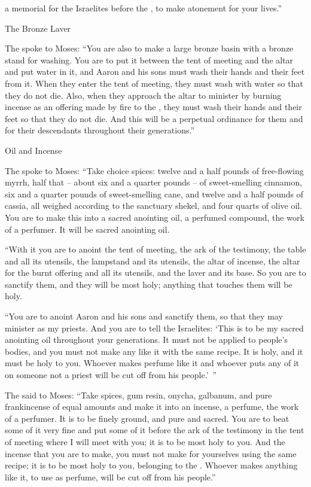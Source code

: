 {a memorial
for the Israelites
before
the {}, to make atonement
for your lives.”
\par }{\SH The Bronze Laver
\par }{\PP {}The
{}
spoke
to
Moses:
“You are also to make
a large
bronze
basin
with a bronze
stand
for washing.
You are to put
it between
the tent
of meeting
and the altar
and put
water
in it,
and Aaron
and his sons
must wash
their hands
and their feet
from it.
When they enter
the tent
of
meeting,
they must wash
with water
so that they do not
die.
Also,
when they approach
the altar
to
minister
by burning incense
as an offering made by fire
to the
{},
they must wash
their hands
and their feet
so that they do not
die.
And this will be
a perpetual
ordinance
for them and for their descendants
throughout their generations.”
\par }{\SH Oil and Incense
\par }{\PP {}The
{}
spoke
to
Moses:
“Take
choice
spices: twelve and a half pounds
of free-flowing
myrrh,
half that – about six and a quarter pounds – of sweet-smelling cinnamon, six and a quarter pounds of sweet-smelling cane,
and twelve and a half pounds
of cassia,
all weighed according to the sanctuary
shekel,
and four quarts
of olive
oil.
You are to make
this into a sacred
anointing
oil,
a perfumed
compound,
the work
of a perfumer.
It will be
sacred
anointing
oil.
\par }{\PP {}“With it you are to anoint
the tent
of meeting,
the ark
of the testimony,
the table
and all
its utensils,
the lampstand
and its
utensils,
the altar
of incense,
the altar
for the burnt offering
and all
its utensils,
and the laver
and its
base.
So you are to sanctify
them, and they will be
most
holy;
anything
that touches
them will be holy.
\par }{\PP {}“You are to anoint
Aaron
and his sons
and sanctify
them, so that they may minister as my priests.
And you are to
tell
the Israelites: ‘This
is to be my sacred
anointing
oil
throughout your generations.
It must not
be applied to people’s
bodies,
and you must not
make
any like
it with the same recipe.
It is
holy,
and it must be
holy to you.
Whoever
makes perfume
like
it and whoever
puts
any
of it on
someone not
a priest will be cut off
from his people.’ ”
\par }{\PP {}The
{}
said
to
Moses: “Take
spices,
gum
resin, onycha,
galbanum,
and pure
frankincense
of equal amounts
and make
it into an incense,
a perfume,
the work
of a perfumer.
It is to be finely
ground, and pure
and sacred.
You are to beat
some
of it very fine and put
some
of it before
the ark of the testimony
in the tent
of meeting
where
I will meet
with you; it is to be
most
holy to you.
And the incense
that
you are
to make,
you must not
make
for yourselves using the same recipe;
it is to be
most holy
to you, belonging to the
{}.
Whoever
makes
anything like
it, to use as perfume,
will be cut off
from his people.”


}
